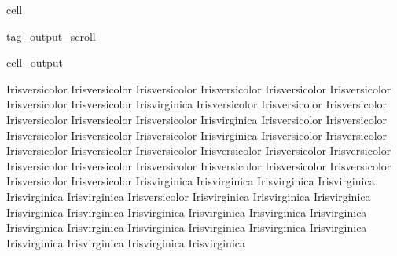 \documentclass[letterpaper,10pt,english]{jupyterBook}
\begin{document}
\begin{sphinxuseclass}{cell}
\begin{sphinxuseclass}{tag_output_scroll}
\begin{sphinxVerbatimOutput}
\begin{sphinxuseclass}{cell_output}
\begin{sphinxVerbatim}[commandchars=\\\{\}]
 \PYGZsq{}Iris\PYGZhy{}versicolor\PYGZsq{} \PYGZsq{}Iris\PYGZhy{}versicolor\PYGZsq{} \PYGZsq{}Iris\PYGZhy{}versicolor\PYGZsq{} \PYGZsq{}Iris\PYGZhy{}versicolor\PYGZsq{}
 \PYGZsq{}Iris\PYGZhy{}versicolor\PYGZsq{} \PYGZsq{}Iris\PYGZhy{}versicolor\PYGZsq{} \PYGZsq{}Iris\PYGZhy{}versicolor\PYGZsq{} \PYGZsq{}Iris\PYGZhy{}versicolor\PYGZsq{}
 \PYGZsq{}Iris\PYGZhy{}virginica\PYGZsq{} \PYGZsq{}Iris\PYGZhy{}versicolor\PYGZsq{} \PYGZsq{}Iris\PYGZhy{}versicolor\PYGZsq{} \PYGZsq{}Iris\PYGZhy{}versicolor\PYGZsq{}
 \PYGZsq{}Iris\PYGZhy{}versicolor\PYGZsq{} \PYGZsq{}Iris\PYGZhy{}versicolor\PYGZsq{} \PYGZsq{}Iris\PYGZhy{}versicolor\PYGZsq{} \PYGZsq{}Iris\PYGZhy{}virginica\PYGZsq{}
 \PYGZsq{}Iris\PYGZhy{}versicolor\PYGZsq{} \PYGZsq{}Iris\PYGZhy{}versicolor\PYGZsq{} \PYGZsq{}Iris\PYGZhy{}versicolor\PYGZsq{} \PYGZsq{}Iris\PYGZhy{}versicolor\PYGZsq{}
 \PYGZsq{}Iris\PYGZhy{}versicolor\PYGZsq{} \PYGZsq{}Iris\PYGZhy{}virginica\PYGZsq{} \PYGZsq{}Iris\PYGZhy{}versicolor\PYGZsq{} \PYGZsq{}Iris\PYGZhy{}versicolor\PYGZsq{}
 \PYGZsq{}Iris\PYGZhy{}versicolor\PYGZsq{} \PYGZsq{}Iris\PYGZhy{}versicolor\PYGZsq{} \PYGZsq{}Iris\PYGZhy{}versicolor\PYGZsq{} \PYGZsq{}Iris\PYGZhy{}versicolor\PYGZsq{}
 \PYGZsq{}Iris\PYGZhy{}versicolor\PYGZsq{} \PYGZsq{}Iris\PYGZhy{}versicolor\PYGZsq{} \PYGZsq{}Iris\PYGZhy{}versicolor\PYGZsq{} \PYGZsq{}Iris\PYGZhy{}versicolor\PYGZsq{}
 \PYGZsq{}Iris\PYGZhy{}versicolor\PYGZsq{} \PYGZsq{}Iris\PYGZhy{}versicolor\PYGZsq{} \PYGZsq{}Iris\PYGZhy{}versicolor\PYGZsq{} \PYGZsq{}Iris\PYGZhy{}versicolor\PYGZsq{}
 \PYGZsq{}Iris\PYGZhy{}versicolor\PYGZsq{} \PYGZsq{}Iris\PYGZhy{}versicolor\PYGZsq{} \PYGZsq{}Iris\PYGZhy{}virginica\PYGZsq{} \PYGZsq{}Iris\PYGZhy{}virginica\PYGZsq{}
 \PYGZsq{}Iris\PYGZhy{}virginica\PYGZsq{} \PYGZsq{}Iris\PYGZhy{}virginica\PYGZsq{} \PYGZsq{}Iris\PYGZhy{}virginica\PYGZsq{} \PYGZsq{}Iris\PYGZhy{}virginica\PYGZsq{}
 \PYGZsq{}Iris\PYGZhy{}versicolor\PYGZsq{} \PYGZsq{}Iris\PYGZhy{}virginica\PYGZsq{} \PYGZsq{}Iris\PYGZhy{}virginica\PYGZsq{} \PYGZsq{}Iris\PYGZhy{}virginica\PYGZsq{}
 \PYGZsq{}Iris\PYGZhy{}virginica\PYGZsq{} \PYGZsq{}Iris\PYGZhy{}virginica\PYGZsq{} \PYGZsq{}Iris\PYGZhy{}virginica\PYGZsq{} \PYGZsq{}Iris\PYGZhy{}virginica\PYGZsq{}
 \PYGZsq{}Iris\PYGZhy{}virginica\PYGZsq{} \PYGZsq{}Iris\PYGZhy{}virginica\PYGZsq{} \PYGZsq{}Iris\PYGZhy{}virginica\PYGZsq{} \PYGZsq{}Iris\PYGZhy{}virginica\PYGZsq{}
 \PYGZsq{}Iris\PYGZhy{}virginica\PYGZsq{} \PYGZsq{}Iris\PYGZhy{}virginica\PYGZsq{} \PYGZsq{}Iris\PYGZhy{}virginica\PYGZsq{} \PYGZsq{}Iris\PYGZhy{}virginica\PYGZsq{}
 \PYGZsq{}Iris\PYGZhy{}virginica\PYGZsq{} \PYGZsq{}Iris\PYGZhy{}virginica\PYGZsq{} \PYGZsq{}Iris\PYGZhy{}virginica\PYGZsq{} \PYGZsq{}Iris\PYGZhy{}virginica\PYGZsq{}

\end{sphinxVerbatim}
\end{sphinxuseclass}
\end{sphinxVerbatimOutput}
\end{sphinxuseclass}
\end{sphinxuseclass}
\end{document}
